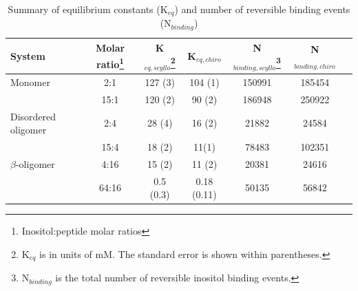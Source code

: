 \begin{table}\footnotesize
  \vspace{10pt}
  \caption{Summary of equilibrium constants (K$_{eq}$) and number of reversible binding events (N$_{binding}$)}

  \label{tbl:bindingConstants}
  \begin{minipage}{15cm}
    \renewcommand{\thefootnote}{\thempfootnote}
    \renewcommand{\footnoterule}{}
      \begin{center}
    \begin{tabular}{| l | *{6}{ c |}}
       \hline
         System & Molar ratio\footnote{Inositol:peptide molar ratios} & K$_{eq,scyllo}$\footnote{K$_{eq}$ is in units of mM. The standard error is shown within parentheses.} & K$_{eq,chiro}$\footnotemark[\value{mpfootnote}]  & N$_{binding,scyllo}$\footnote{N$_{binding}$ is the total number of reversible inositol binding events.} & N$_{binding,chiro}$\footnotemark[\value{mpfootnote}] \\
         \hline
         \hline
         Monomer & 2:1 & 127 (3) & 104 (1)  &  150991 & 185454 \\ %
          	       & 15:1 & 120 (2) & 90 (2)  & 186948 & 250922  \\ %
	\hline
         Disordered oligomer & 2:4 & 28 (4) & 16 (2) &  21882 & 24584 \\ %
          			       & 15:4 & 18 (2) & 11(1) & 78483 & 102351 \\ %
	\hline
         $\beta$-oligomer & 4:16 & 15 (2) & 11 (2) & 20381 & 24616 \\ %
         				  & 64:16 &  0.5 (0.3) & 0.18 (0.11) & 50135 & 56842 \\ %
         \hline
     \end{tabular}   
  \end{center}
  \end{minipage}
  \centering
  \end{table}

